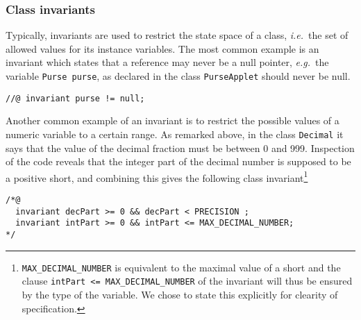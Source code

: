 \documentclass[a4paper]{llncs}
\begin{document}






\subsubsection{Class invariants}
Typically, invariants are used to restrict the state space of a class,
\emph{i.e.}~the set of allowed values for its instance variables. The
most common example is an invariant which states that a reference may
never be a null pointer, \emph{e.g.}~the variable
\texttt{Purse purse}, as declared in the class \texttt{PurseApplet}
should never be null.
\begin{verbatim}
//@ invariant purse != null;
\end{verbatim}
Another common example of an invariant is to restrict the possible
values of a numeric variable to a certain range. As remarked above, in
the class \texttt{Decimal} it says that the value of the decimal
fraction must be between 0 and 999. Inspection of the code reveals 
that the integer part of the decimal number is supposed to be a
positive short, and combining this gives the following class
invariant\footnote{\texttt{MAX\_DECIMAL\_NUMBER} is equivalent to the
maximal value of a short and the clause \texttt{intPart <=
MAX\_DECIMAL\_NUMBER} of the invariant will thus be
ensured by the type of the variable. We chose to state this explicitly
for clearity of specification.}
\begin{verbatim}
/*@
  invariant decPart >= 0 && decPart < PRECISION ;
  invariant intPart >= 0 && intPart <= MAX_DECIMAL_NUMBER;
*/
\end{verbatim}
\end{document}
